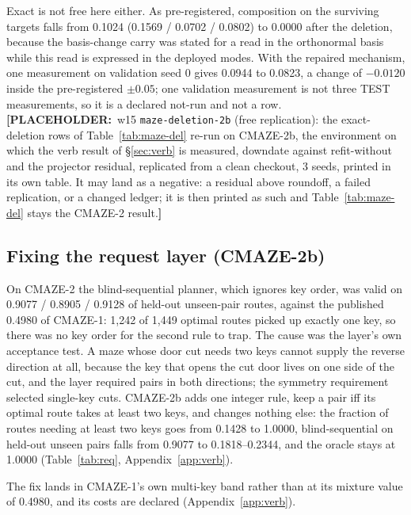 \documentclass{article} %
\newcommand{\PLACEHOLDER}[1]{{\color{red}\textbf{[PLACEHOLDER:}~#1\textbf{]}}}
\begin{document}
\noindent Exact is not free here either. As pre-registered, composition on the surviving
targets falls from 0.1024 (0.1569 / 0.0702 / 0.0802) to 0.0000 after the deletion, because the
basis-change carry was stated for a read in the orthonormal basis while this read is expressed
in the deployed modes. With the repaired mechanism, one measurement on validation seed 0 gives
0.0944 to 0.0823, a change of $-0.0120$ inside the pre-registered $\pm0.05$; one validation
measurement is not three TEST measurements, so it is a declared not-run and not a row.
\PLACEHOLDER{w15 \texttt{maze-deletion-2b} (free replication): the exact-deletion rows of
Table~\ref{tab:maze-del} re-run on CMAZE-2b, the environment on which the verb result of
\S\ref{sec:verb} is measured, downdate against refit-without and the projector residual,
replicated from a clean checkout, 3 seeds, printed in its own table. It may land as a
negative: a residual above roundoff, a failed replication, or a changed ledger; it is then
printed as such and Table~\ref{tab:maze-del} stays the CMAZE-2 result.}

\subsection{Fixing the request layer (CMAZE-2b)}
\label{sec:req-layer}

On CMAZE-2 the blind-sequential planner, which ignores key order, was valid on 0.9077 /
0.8905 / 0.9128 of held-out unseen-pair routes, against the published 0.4980 of CMAZE-1: 1,242
of 1,449 optimal routes picked up exactly one key, so there was no key order for the second rule
to trap. %
The cause was the layer's own acceptance test. A maze whose door cut needs two keys cannot
supply the reverse direction at all, because the key that opens the cut door lives on one side
of the cut, and the layer required pairs in both directions; the symmetry requirement selected
single-key cuts. %
CMAZE-2b adds one integer rule, keep a pair iff its optimal route takes at least two keys, and
changes nothing else: the fraction of routes needing at least two keys goes from 0.1428 to
1.0000, blind-sequential on held-out unseen pairs falls from 0.9077 to 0.1818--0.2344, and the
oracle stays at 1.0000 (Table~\ref{tab:req}, Appendix~\ref{app:verb}). %

The fix lands in CMAZE-1's own multi-key band rather than at its mixture value of 0.4980, and %
its costs are declared (Appendix~\ref{app:verb}).
\end{document}
